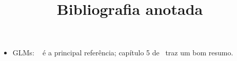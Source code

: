 \documentclass[12pt]{article}
\title{Bibliografia anotada}
\begin{document}
\begin{itemize}
 \item GLMs: ~\cite{Mccullagh1989} é a principal referência; capítulo 5 de~\cite{McCulloch2001} traz um bom resumo. 
\end{itemize}

\nocite{*}



\end{document}
